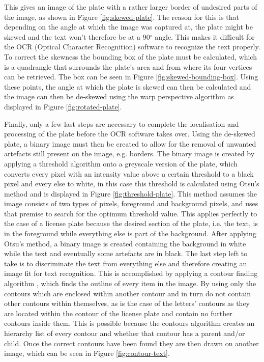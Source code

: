 This gives an image of the plate with a rather larger border of undesired parts of the image, as shown in Figure \ref{fig:skewed-plate}. The reason for this is that depending on the angle at which the image was captured at, the plate might be skewed and the text won't therefore be at a 90$^{\circ}$ angle. This makes it difficult for the OCR (Optical Character Recognition) software to recognize the text properly. To correct the skewness the bounding box of the plate must be calculated, which is a quadrangle that surrounds the plate's area and from where its four vertices can be retrieved. The box can be seen in Figure \ref{fig:skewed-bounding-box}. Using these points, the angle at which the plate is skewed can then be calculated and the image can then be de-skewed using the warp perspective algorithm \cite{warpperspective} as displayed in Figure \ref{fig:rotated-plate}. 

Finally, only a few last steps are necessary to complete the localisation and processing of the plate before the OCR software takes over. Using the de-skewed plate, a binary image must then be created to allow for the removal of unwanted artefacts still present on the image, e.g. borders. The binary image is created by applying a threshold algorithm onto a greyscale version of the plate, which converts every pixel with an intensity value above a certain threshold to a black pixel and every else to white, in this case this threshold is calculated using Otsu's method \cite{otsu} and is displayed in Figure \ref{fig:threshold-plate}. This method assumes the image consists of two types of pixels, foreground and background pixels, and uses that premise to search for the optimum threshold value. This applies perfectly to the case of a license plate because the desired section of the plate, i.e. the text, is in the foreground while everything else is part of the background. After applying Otsu's method, a binary image is created containing the background in white while the text and eventually some artefacts are in black. The last step left to take is to discriminate the text from everything else and therefore creating an image fit for text recognition. This is accomplished by applying a contour finding algorithm \cite{suzuki}, which finds the outline of every item in the image. By using only the contours which are enclosed within another contour and in turn do not contain other contours within themselves, as is the case of the letters' contours as they are located within the contour of the license plate and contain no further contours inside them. This is possible because the contours algorithm creates an hierarchy list of every contour and whether that contour has a parent and/or child. Once the correct contours have been found they are then drawn on another image, which can be seen in Figure \ref{fig:contour-text}.

